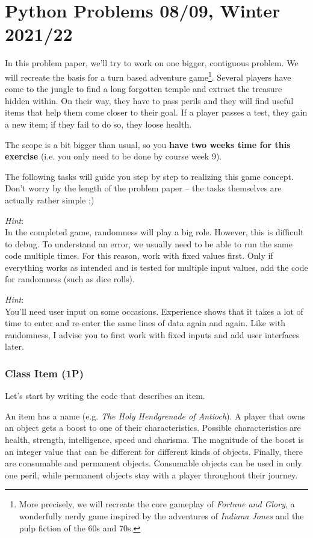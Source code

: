 \documentclass[
	english,
	fontsize=10pt,
	parskip=half,
	titlepage=true,
	DIV=12
]{scrartcl}
\newcommand*{\eg}{e.\;g. }
\begin{document}
\part*{Python Problems 08/09, Winter 2021/22}
In this problem paper, we'll try to work on one bigger, contiguous problem. We will recreate the basis for a turn based adventure game\footnote{More precisely, we will recreate the core gameplay of \emph{Fortune and Glory}, a wonderfully nerdy game inspired by the adventures of \emph{Indiana Jones} and the pulp fiction of the 60s and 70s.}. Several players have come to the jungle to find a long forgotten temple and extract the treasure hidden within. On their way, they have to pass perils and they will find useful items that help them come closer to their goal. If a player passes a test, they gain a new item; if they fail to do so, they loose health.

The scope is a bit bigger than usual, so you \textbf{have two weeks time for this exercise} (i.e. you only need to be done by course week 9). 

The following tasks will guide you step by step to realizing this game concept. Don't worry by the length of the problem paper -- the tasks themselves are actually rather simple ;)

\emph{Hint}:\\
In the completed game, randomness will play a big role. However, this is difficult to debug. To understand an error, we usually need to be able to run the same code multiple times. For this reason, work with fixed values first. Only if everything works as intended and is tested for multiple input values, add the code for randomness (such as dice rolls).

\emph{Hint}:\\
You'll need user input on some occasions. Experience shows that it takes a lot of time to enter and re-enter the same lines of data again and again. Like with randomness, I advise you to first work with fixed inputs and add user interfaces later.


\section{Class Item (1\;P)}
Let's start by writing the code that describes an item.

An item has a name (\eg \emph{The Holy Hendgrenade of Antioch}). A player that owns an object gets a boost to one of their characteristics. Possible characteristics are health, strength, intelligence, speed and charisma. The magnitude of the boost is an integer value that can be different for different kinds of objects. Finally, there are consumable and permanent objects. Consumable objects can be used in only one peril, while permanent objects stay with a player throughout their journey.
\end{document}
